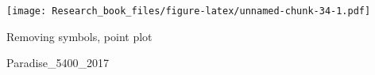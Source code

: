 \documentclass[]{book}
\newenvironment{Shaded}{\begin{snugshade}}{\end{snugshade}}
\newcommand{\KeywordTok}[1]{\textcolor[rgb]{0.13,0.29,0.53}{\textbf{#1}}}
\newcommand{\DataTypeTok}[1]{\textcolor[rgb]{0.13,0.29,0.53}{#1}}
\newcommand{\DecValTok}[1]{\textcolor[rgb]{0.00,0.00,0.81}{#1}}
\newcommand{\StringTok}[1]{\textcolor[rgb]{0.31,0.60,0.02}{#1}}
\newcommand{\OperatorTok}[1]{\textcolor[rgb]{0.81,0.36,0.00}{\textbf{#1}}}
\newcommand{\NormalTok}[1]{#1}
\theoremstyle{definition}
\theoremstyle{definition}
\theoremstyle{definition}
\theoremstyle{remark}
\begin{document}
\texttt{[image: Research\_book\_files/figure-latex/unnamed-chunk-34-1.pdf]}

Removing symbols, point plot

\begin{Shaded}
\begin{Highlighting}[]
\NormalTok{Paradise_5400_}\DecValTok{2017} \OperatorTok{%>%}\StringTok{ }\KeywordTok{group_by}\NormalTok{(date,month,day,hr) }\OperatorTok{%>%}\StringTok{ }\KeywordTok{filter}\NormalTok{(}\KeywordTok{as.numeric}\NormalTok{(month) }\OperatorTok{%in%}\StringTok{ }\KeywordTok{c}\NormalTok{(}\DecValTok{7}\NormalTok{,}\DecValTok{8}\NormalTok{,}\DecValTok{9}\NormalTok{) }\OperatorTok{&}\StringTok{ }\KeywordTok{as.numeric}\NormalTok{(day) }\OperatorTok{%in%}\StringTok{ }\KeywordTok{c}\NormalTok{(}\DecValTok{15}\NormalTok{,}\DecValTok{16}\NormalTok{,}\DecValTok{17}\NormalTok{,}\DecValTok{18}\NormalTok{,}\DecValTok{19}\NormalTok{,}\DecValTok{20}\NormalTok{) ) }\OperatorTok{%>%}\StringTok{ }\KeywordTok{ggplot}\NormalTok{(}\KeywordTok{aes}\NormalTok{(}\DataTypeTok{x =}\NormalTok{ hr, }\DataTypeTok{y =}\NormalTok{ Temperature..deg.F.,}\DataTypeTok{color=}\NormalTok{month)) }\OperatorTok{+}\StringTok{ }\KeywordTok{geom_point}\NormalTok{(}\DataTypeTok{data =} \KeywordTok{subset}\NormalTok{(Paradise_5400_}\DecValTok{2017}\NormalTok{,month }\OperatorTok{%in%}\StringTok{ }\KeywordTok{c}\NormalTok{(}\StringTok{"07"}\NormalTok{) }\OperatorTok{&}\StringTok{ }\NormalTok{day }\OperatorTok{%in%}\StringTok{ }\KeywordTok{c}\NormalTok{(}\StringTok{"15"}\NormalTok{,}\StringTok{"16"}\NormalTok{,}\StringTok{"17"}\NormalTok{,}\StringTok{"18"}\NormalTok{,}\StringTok{"19"}\NormalTok{,}\StringTok{"20"}\NormalTok{)))}\OperatorTok{+}\StringTok{ }\KeywordTok{geom_point}\NormalTok{(}\DataTypeTok{data =} \KeywordTok{subset}\NormalTok{(Paradise_5400_}\DecValTok{2017}\NormalTok{,month }\OperatorTok{%in%}\StringTok{ }\KeywordTok{c}\NormalTok{(}\StringTok{"08"}\NormalTok{) }\OperatorTok{&}\StringTok{ }\NormalTok{day }\OperatorTok{%in%}\StringTok{ }\KeywordTok{c}\NormalTok{(}\StringTok{"15"}\NormalTok{,}\StringTok{"16"}\NormalTok{,}\StringTok{"17"}\NormalTok{,}\StringTok{"18"}\NormalTok{,}\StringTok{"19"}\NormalTok{,}\StringTok{"20"}\NormalTok{)  ))}\OperatorTok{+}\StringTok{ }\KeywordTok{geom_point}\NormalTok{(}\DataTypeTok{data =} \KeywordTok{subset}\NormalTok{(Paradise_5400_}\DecValTok{2017}\NormalTok{,month }\OperatorTok{%in%}\StringTok{ }\KeywordTok{c}\NormalTok{(}\StringTok{"09"}\NormalTok{) }\OperatorTok{&}\StringTok{ }\NormalTok{day }\OperatorTok{%in%}\StringTok{ }\KeywordTok{c}\NormalTok{(}\StringTok{"15"}\NormalTok{,}\StringTok{"16"}\NormalTok{,}\StringTok{"17"}\NormalTok{,}\StringTok{"18"}\NormalTok{,}\StringTok{"19"}\NormalTok{,}\StringTok{"20"}\NormalTok{)  ))  }\OperatorTok{+}\KeywordTok{theme_minimal}\NormalTok{() }\OperatorTok{+}\KeywordTok{xlab}\NormalTok{(}\StringTok{"Hour"}\NormalTok{) }\OperatorTok{+}\StringTok{ }\KeywordTok{ylab}\NormalTok{(}\StringTok{"Temperature"}\NormalTok{) }\OperatorTok{+}\StringTok{ }\KeywordTok{ggtitle}\NormalTok{(}\StringTok{"Paradise 5400 NWAC - Calendar year 2017  - Days(15-18) "}\NormalTok{) }\OperatorTok{+}\StringTok{ }\KeywordTok{scale_color_discrete}\NormalTok{(}\DataTypeTok{name=}\StringTok{"Month"}\NormalTok{)}
}
\end{Highlighting}
\end{Shaded}
\end{document}
